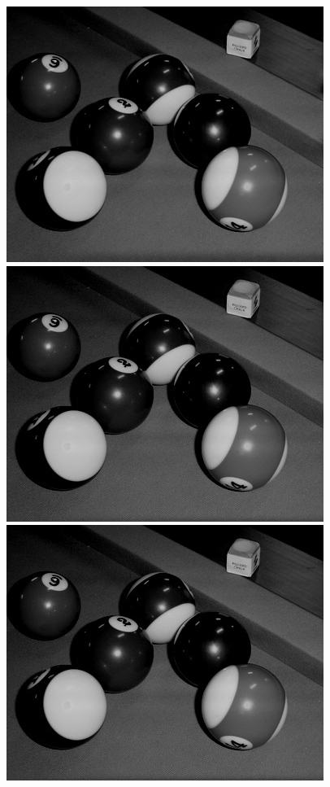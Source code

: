 \documentclass[11pt,a4paper,oneside]{article}
\begin{document}
	\begin{figure}[!htbp]
		\centering
		\includegraphics[scale=0.4]{fig/balls_cyc.jpg}
		\includegraphics[scale=0.4]{fig/balls_mer.jpg}
		\includegraphics[scale=0.4]{fig/balls_chess.jpg}

\end{figure}
\end{document}
